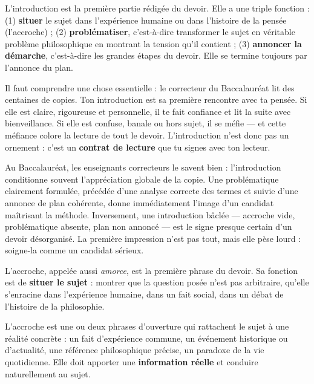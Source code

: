 \documentclass[11pt]{article}
\newcommand{\cle}[1]{{\popxbold\color{popdark}#1}}
\newcounter{popsec}
\newcounter{popsub}
\newcommand{\courssub}[1]{%
  \stepcounter{popsub}%
  \par\vspace{9pt}\noindent{\popxbold\fontsize{11.5}{13}\selectfont\color{popink}{\color{poporange}\thepopsec.\thepopsub}\hspace{6pt}#1}\par\nopagebreak\vspace{4pt}
}
\begin{document}
\begin{definition}[L'introduction]
L'\cle{introduction} est la première partie rédigée du devoir. Elle a une triple fonction : (1) \textbf{situer} le sujet dans l'expérience humaine ou dans l'histoire de la pensée (l'accroche) ; (2) \textbf{problématiser}, c'est-à-dire transformer le sujet en véritable problème philosophique en montrant la tension qu'il contient ; (3) \textbf{annoncer la démarche}, c'est-à-dire les grandes étapes du devoir. Elle se termine toujours par l'annonce du plan.
\end{definition}

Il faut comprendre une chose essentielle : le correcteur du Baccalauréat lit des centaines de copies. Ton introduction est sa première rencontre avec ta pensée. Si elle est claire, rigoureuse et personnelle, il te fait confiance et lit la suite avec bienveillance. Si elle est confuse, banale ou hors sujet, il se méfie — et cette méfiance colore la lecture de tout le devoir. L'introduction n'est donc pas un ornement : c'est un \textbf{contrat de lecture} que tu signes avec ton lecteur.

\begin{savaistu}
Au Baccalauréat, les enseignants correcteurs le savent bien : l'introduction conditionne souvent l'appréciation globale de la copie. Une problématique clairement formulée, précédée d'une analyse correcte des termes et suivie d'une annonce de plan cohérente, donne immédiatement l'image d'un candidat maîtrisant la méthode. Inversement, une introduction bâclée — accroche vide, problématique absente, plan non annoncé — est le signe presque certain d'un devoir désorganisé. La première impression n'est pas tout, mais elle pèse lourd : soigne-la comme un candidat sérieux.
\end{savaistu}

\courssub{Étape 1 : l'accroche (ou amorce)}

L'\cle{accroche}, appelée aussi \emph{amorce}, est la première phrase du devoir. Sa fonction est de \textbf{situer le sujet} : montrer que la question posée n'est pas arbitraire, qu'elle s'enracine dans l'expérience humaine, dans un fait social, dans un débat de l'histoire de la philosophie.

\begin{definition}[L'accroche]
L'\cle{accroche} est une ou deux phrases d'ouverture qui rattachent le sujet à une réalité concrète : un fait d'expérience commune, un événement historique ou d'actualité, une référence philosophique précise, un paradoxe de la vie quotidienne. Elle doit apporter une \textbf{information réelle} et conduire naturellement au sujet.
\end{definition}
\end{document}
